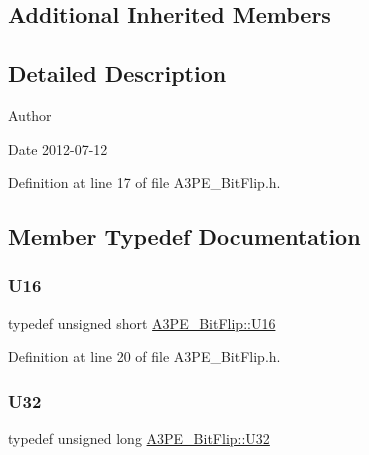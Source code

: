 \subsection*{Additional Inherited Members}


\subsection{Detailed Description}
\begin{DoxyAuthor}{Author}

\end{DoxyAuthor}
\begin{DoxyDate}{Date}
2012-\/07-\/12 
\end{DoxyDate}


Definition at line 17 of file A3\+P\+E\+\_\+\+Bit\+Flip.\+h.



\subsection{Member Typedef Documentation}
\mbox{\label{classA3PE__BitFlip_a0fa3a1814a6661198e0ce5156d1cc474}} 
\subsubsection{\texorpdfstring{U16}{U16}}
{\footnotesize\ttfamily typedef unsigned short \hyperlink{classA3PE__BitFlip_a0fa3a1814a6661198e0ce5156d1cc474}{A3\+P\+E\+\_\+\+Bit\+Flip\+::\+U16}}



Definition at line 20 of file A3\+P\+E\+\_\+\+Bit\+Flip.\+h.

\mbox{\label{classA3PE__BitFlip_aaf047b5086a5ea11db565ce8283edfb4}} 
\subsubsection{\texorpdfstring{U32}{U32}}
{\footnotesize\ttfamily typedef unsigned long \hyperlink{classA3PE__BitFlip_aaf047b5086a5ea11db565ce8283edfb4}{A3\+P\+E\+\_\+\+Bit\+Flip\+::\+U32}}



